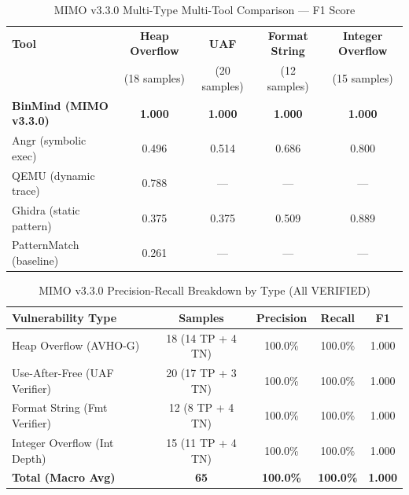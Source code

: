 \begin{table}[htbp]
  \centering
  \caption{MIMO v3.3.0 Multi-Type Multi-Tool Comparison — F1 Score}
  \label{tab:mimo-multi}
  \begin{tabular}{lcccc}
    \toprule
    \textbf{Tool} & \textbf{Heap Overflow} & \textbf{UAF} & \textbf{Format String} & \textbf{Integer Overflow} \\
    & (18 samples) & (20 samples) & (12 samples) & (15 samples) \\
    \midrule
    \rowcolor{blue!10}
    \textbf{BinMind (MIMO v3.3.0)} & \textbf{1.000} & \textbf{1.000} & \textbf{1.000} & \textbf{1.000} \\
    Angr (symbolic exec) & 0.496 & 0.514 & 0.686 & 0.800 \\
    QEMU (dynamic trace) & 0.788 & — & — & — \\
    Ghidra (static pattern) & 0.375 & 0.375 & 0.509 & 0.889 \\
    PatternMatch (baseline) & 0.261 & — & — & — \\
    \bottomrule
  \end{tabular}
\end{table}

\begin{table}[htbp]
  \centering
  \caption{MIMO v3.3.0 Precision-Recall Breakdown by Type (All VERIFIED)}
  \label{tab:mimo-breakdown}
  \begin{tabular}{lcccc}
    \toprule
    \textbf{Vulnerability Type} & \textbf{Samples} & \textbf{Precision} & \textbf{Recall} & \textbf{F1} \\
    \midrule
    \rowcolor{blue!10}
    Heap Overflow (AVHO-G) & 18 (14 TP + 4 TN) & 100.0\% & 100.0\% & 1.000 \\
    \rowcolor{blue!10}
    Use-After-Free (UAF Verifier) & 20 (17 TP + 3 TN) & 100.0\% & 100.0\% & 1.000 \\
    \rowcolor{blue!10}
    Format String (Fmt Verifier) & 12 (8 TP + 4 TN) & 100.0\% & 100.0\% & 1.000 \\
    \rowcolor{blue!10}
    Integer Overflow (Int Depth) & 15 (11 TP + 4 TN) & 100.0\% & 100.0\% & 1.000 \\
    \midrule
    \textbf{Total (Macro Avg)} & \textbf{65} & \textbf{100.0\%} & \textbf{100.0\%} & \textbf{1.000} \\
    \bottomrule
  \end{tabular}
\end{table}

